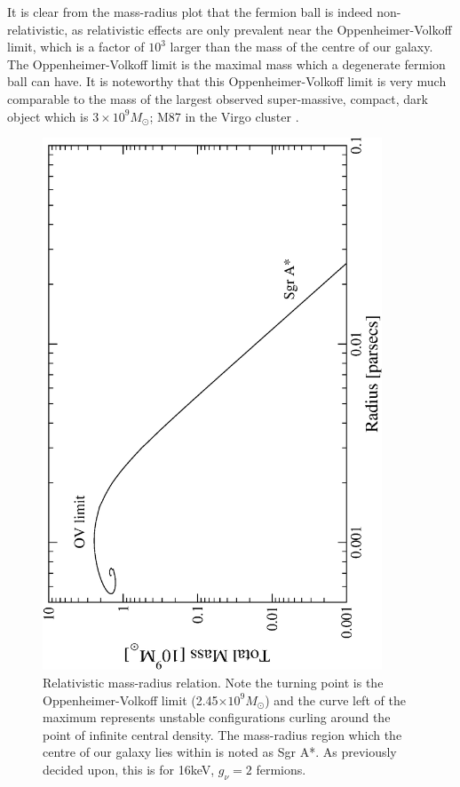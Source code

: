 It is clear from the mass-radius plot that the fermion ball is indeed non-relativistic, as relativistic
effects are only prevalent near the Oppenheimer-Volkoff limit, which is a factor of $10^3$ larger than the mass of the centre of our galaxy.
The Oppenheimer-Volkoff limit is the maximal mass which a degenerate fermion ball can have.
It is noteworthy that this Oppenheimer-Volkoff limit is very much comparable to the mass of the largest
observed super-massive, compact, dark object which is $3\times 10^9M_\odot$; M87 in the Virgo cluster \cite{ref_centralobjects}.
\begin{figure}[!p]
	\begin{center}
	\includegraphics[angle=-90,width=0.9\textwidth]{eps/relativisticmvssr.eps}
	\caption{Relativistic mass-radius relation. Note the turning point is the Oppenheimer-Volkoff limit (2.45$\times 10^9 M_\odot$)
	and the curve left of the maximum represents unstable configurations curling around the point of infinite central density.
	The mass-radius region which the centre of our galaxy lies within is noted as Sgr A*. As previously decided upon, this
	is for 16keV, $g_\nu=2$ fermions.}
	\label{fig_relativisticmvsr}
	\end{center}
\end{figure}
